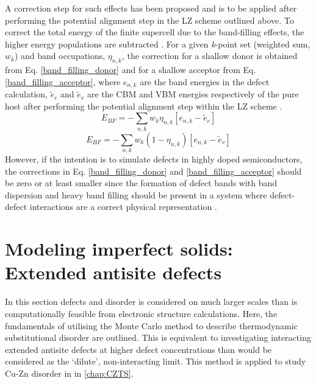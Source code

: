 \documentclass[11pt, twoside]{report}
\begin{document}
A correction step for such effects has been proposed \cite{CIS_defects, Lany_defects_2008, Lany_defects} and is to be applied after performing the potential alignment step in the LZ scheme outlined above.
To correct the total energy of the finite supercell due to the band-filling effects, the higher energy populations are subtracted \cite{CIS_defects}.
For a given \textit{k}-point set (weighted sum, $w_k$) and band occupations, $\eta_{n,k}$, the correction for a shallow donor is obtained from Eq. \ref{band_filling_donor} and for a shallow acceptor from Eq. \ref{band_filling_acceptor}, where $e_{n,k}$ are the band energies in the defect calculation, $\tilde{e}_c$ and $\tilde{e}_v$ are the CBM and VBM energies respectively of the pure host after performing the potential alignment step within the LZ scheme \cite{pylada}.
\begin{equation}\label{band_filling_donor}
E_{BF} = - \sum_{n,k} w_k \eta_{n,k} [e_{n,k} - \tilde{e}_c]
\end{equation}
\begin{equation}\label{band_filling_acceptor}
E_{BF} = - \sum_{n,k} w_k (1 - \eta_{n,k}) [e_{n,k} - \tilde{e}_v]
\end{equation}
However, if the intention is to simulate defects in highly doped semiconductors, the corrections in Eq. \ref{band_filling_donor} and \ref{band_filling_acceptor} should be zero or at least smaller since the formation of defect bands with band dispersion and heavy band filling should be present in a system where defect-defect interactions are a correct physical representation \cite{CIS_defects}.


\section{Modeling imperfect solids: Extended antisite defects}\label{MC}
In this section defects and disorder is considered on much larger scales than is computationally feasible from electronic structure calculations.
Here, the fundamentals of utilising the Monte Carlo method to describe thermodynamic substitutional disorder are outlined. This is equivalent to investigating interacting extended antisite defects at higher defect concentrations than would be considered as the `dilute', non-interacting limit. This method is applied to study Cu-Zn disorder in {\CZTS} in \autoref{chap:CZTS}.
\end{document}
